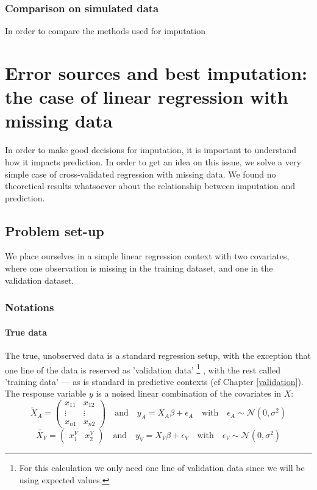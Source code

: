 \documentclass[12pt, a4paper]{memoir}
\begin{document}
		\subsection{Comparison on simulated data}
In order to compare the methods used for imputation
		

		
\chapter{Error sources and best imputation: the case of linear regression with missing data}
In order to make good decisions for imputation, it is important to understand how it impacts prediction. In order to get an idea on this issue, we solve a very simple case of cross-validated regression with missing data. We found no theoretical results whatsoever about the relationship between imputation and prediction. 
\label{linreg}
	\section{Problem set-up}
We place ourselves in a simple linear regression context with two covariates, where one observation is missing in the training dataset, and one in the validation dataset.

		\subsection{Notations}
			\subsubsection{True data}
The true, unobserved data is a standard regression setup, with the exception that one line of the data is reserved as 'validation data'
\footnote{For this calculation we only need one line of validation data since we will be using expected values.}
, with the rest called 'training data' --- as is standard in predictive contexts (cf Chapter \ref{validation}). The response variable $y$ is a noised linear combination of the covariates in $X$:
\begin{equation*}
\tilde{X}_A = 
\begin{pmatrix}
x_{11} & x_{12} \\
\vdots & \vdots \\
x_{n1} & x_{n2}
\end{pmatrix}
\quad \mathrm{and} \quad
y_A = X_A \beta + \epsilon_A
\quad \mathrm{with} \quad
\epsilon_A \sim \mathcal{N}(0, \sigma^2)
\end{equation*}
\begin{equation*}
\tilde{X_V} = 
\begin{pmatrix}
x_{1}^V & x_{2}^V
\end{pmatrix}
\quad \mathrm{and} \quad
y_V = X_V \beta + \epsilon_V
\quad \mathrm{with} \quad
\epsilon_V \sim \mathcal{N}(0, \sigma^2)
\end{equation*}
\end{document}
